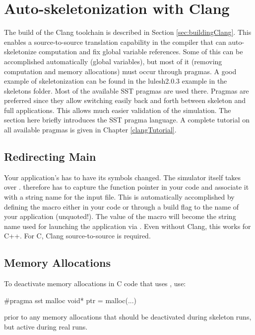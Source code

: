 \section{Auto-skeletonization with Clang}
\label{sec:autoSkeletonization}

The build of the Clang toolchain is described in Section \ref{sec:buildingClang}. 
This enables a source-to-source translation capability in the  compiler that can auto-skeletonize computation and fix global variable references.
Some of this can be accomplished automatically (global variables), but most of it (removing computation and memory allocations) must occur through pragmas.
A good example of skeletonization can be found in the lulesh2.0.3 example in the skeletons folder. Most of the available SST pragmas are used there.
Pragmas are preferred since they allow switching easily back and forth between skeleton and full applications.
This allows much easier validation of the simulation. The section here briefly introduces the SST pragma language.
A complete tutorial on all available pragmas is given in Chapter \ref{clangTutorial}.

\subsection{Redirecting Main}
\label{subsec:redirectMain}

Your application's  has to have its symbols changed.
The simulator itself takes over .
\sstmacro therefore has to capture the function pointer in your code and associate it with a string name for the input file.
This is automatically accomplished by defining the macro  either in your code or through a  build flag to the name of your application (unquoted!). The value of the macro will become the string name used for launching the application via .
Even without Clang, this works for C++. For C, Clang source-to-source is required.

\subsection{Memory Allocations}
\label{subsec:memoryAllocations}

To deactivate memory allocations in C code that uses , use:
\begin{CppCode}
#pragma sst malloc
  void* ptr = malloc(...)
\end{CppCode}
prior to any memory allocations that should be deactivated during skeleton runs, but active during real runs.

